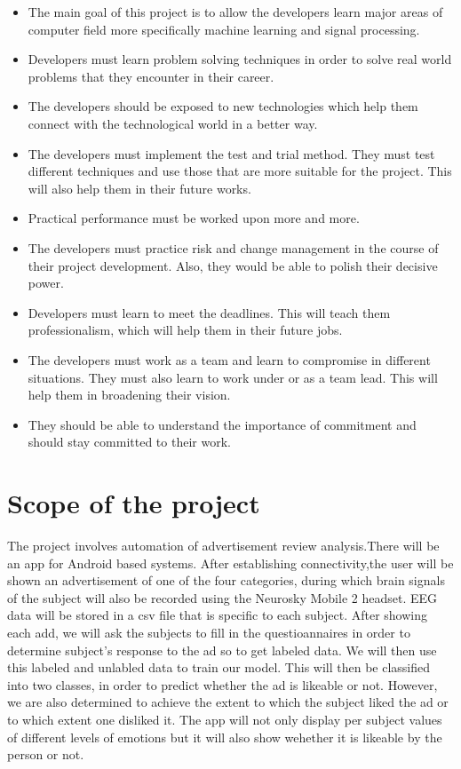 \documentclass[a4paper, 12pt, oneside]{uet_thesis}
\begin{document}
\begin{itemize}
\item The main goal of this project is to allow the developers learn major areas of computer field more specifically machine learning and signal processing.
\item Developers must learn problem solving techniques in order to solve real world problems that they encounter in their career.
\item The developers should be exposed to new technologies which help them connect with the technological world in a better way.
\item The developers must implement the test and trial method. They must test different techniques and use those that are more suitable for the project. This will also help them in their future works.
\item Practical performance must be worked upon more and more.
\item The developers must practice risk and change management in the course of their project development. Also, they would be able to polish their decisive power.
\item Developers must learn to meet the deadlines. This will teach them professionalism, which will help them in their future jobs.
\item The developers must work as a team and learn to compromise in different situations. They must also learn to work under or as a team lead. This will help them in broadening their vision.
\item They should be able to understand the importance of commitment and should stay committed to their work.
\end{itemize}

\newpage
\chapter{Scope of the project}
The project involves automation of advertisement review analysis.There will be an app for Android based systems. After establishing connectivity,the user will be shown an advertisement of one of the four categories, during which  brain signals of the subject will also be recorded using the Neurosky Mobile 2 headset. EEG data will be stored in a csv file that is specific to each subject. After showing each add, we will ask the subjects to fill in the questioannaires in order to determine subject's response to the ad so to get labeled data. We will then use this labeled and unlabled data to train our model. This will then be classified into two classes, in order to predict whether the ad is likeable or  not. However, we are also determined to achieve the extent to which the subject liked the ad or to which extent one disliked it. The app will not only display per subject values of different levels of emotions but it will also show wehether it is likeable by the person or not.
\newpage
\end{document}
